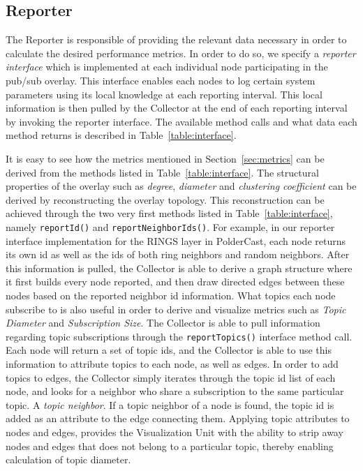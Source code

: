 \subsection{Reporter}

The Reporter is responsible of providing the relevant data necessary in
order to calculate the desired performance metrics. In order to do so,
we specify a \emph{reporter interface} which is implemented at each
individual node participating in the pub/sub overlay. This interface
enables each nodes to log certain system parameters using its local
knowledge at each reporting interval. This local information is then pulled
by the Collector at the end of each reporting interval by invoking the
reporter interface. The available method calls and what data each method
returns is described in Table~\ref{table:interface}.



It is easy to see how the metrics mentioned in Section~\ref{sec:metrics}
can be derived from the methods listed in Table~\ref{table:interface}.
The structural properties of the overlay such as \emph{degree},
\emph{diameter} and \emph{clustering coefficient} can be derived by
reconstructing the overlay topology. This reconstruction can be achieved
through the two very first methods listed in
Table~\ref{table:interface}, namely \texttt{reportId()} and \texttt{reportNeighborIds()}.
For example, in our reporter interface
implementation for the RINGS layer in PolderCast, each node returns its
own id as well as the ids of both ring neighbors and random neighbors.
After this information is pulled, the Collector is able to derive a
graph structure where it first builds every node reported, and then draw
directed edges between these nodes based on the reported neighbor id
information. What topics each node subscribe to is also useful in order
to derive and visualize metrics such as \emph{Topic Diameter} and \emph{Subscription
    Size}. The Collector is able to pull information regarding topic
subscriptions through the \texttt{reportTopics()} interface method call.
Each node will return a set of topic ids, and the Collector is able to
use this information to attribute topics to each node, as well as edges.
In order to add topics to edges, the Collector simply iterates through
the topic id list of each node, and looks for a neighbor who share a
subscription to the same particular topic. A \emph{topic neighbor}. If a
topic neighbor of a node is found, the topic id is added as an attribute
to the edge connecting them. Applying topic attributes to nodes and
edges, provides the Visualization Unit with the ability to strip away
nodes and edges that does not belong to a particular topic, thereby
enabling calculation of topic diameter.

